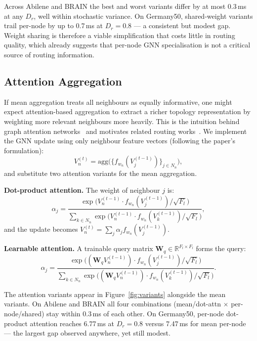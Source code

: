 \documentclass[10pt,twocolumn,letterpaper]{article}
\begin{document}
Across Abilene and BRAIN the best and worst variants differ by at most
0.3\,ms at any $D_r$, well within stochastic variance. On Germany50,
shared-weight variants trail per-node by up to 0.7\,ms at $D_r = 0.8$
--- a consistent but modest gap. Weight sharing is therefore a viable
simplification that costs little in routing quality, which already
suggests that per-node GNN specialisation is not a critical source of
routing information.

\subsection{Attention Aggregation}
\label{sec:attn}

If mean aggregation treats all neighbours as equally informative, one
might expect attention-based aggregation to extract a richer topology
representation by weighting more relevant neighbours more heavily. This
is the intuition behind graph attention networks~\cite{velickovic2018}
and motivates related routing works~\cite{strl,autognn}. We implement
the GNN update using only neighbour feature vectors (following the
paper's formulation):
\begin{equation}
  V_n^{(t)} = \mathrm{agg}\!\bigl(\{f_{w_n}(V_j^{(t-1)})\}_{j \in N_n}\bigr),
  \label{eq:gnn-nbr}
\end{equation}
and substitute two attention variants for the mean aggregation.

\textbf{Dot-product attention.} The weight of neighbour $j$ is:
\begin{equation}
  \alpha_j = \frac{
    \exp\!\bigl(V_n^{(t-1)} \cdot f_{w_n}(V_j^{(t-1)}) / \sqrt{F_l}\bigr)
  }{
    \sum_{k \in N_n}\!\exp\!\bigl(V_n^{(t-1)} \cdot f_{w_n}(V_k^{(t-1)}) / \sqrt{F_l}\bigr)
  },
  \label{eq:dot-attn}
\end{equation}
and the update becomes $V_n^{(t)} = \sum_{j} \alpha_j f_{w_n}(V_j^{(t-1)})$.

\textbf{Learnable attention.} A trainable query matrix
$\mathbf{W}_q \in \mathbb{R}^{F_l \times F_l}$ forms the query:
\begin{equation}
  \alpha_j = \frac{
    \exp\!\bigl((\mathbf{W}_q V_n^{(t-1)}) \cdot f_{w_n}(V_j^{(t-1)}) / \sqrt{F_l}\bigr)
  }{
    \sum_{k \in N_n}\!\exp\!\bigl((\mathbf{W}_q V_n^{(t-1)}) \cdot f_{w_n}(V_k^{(t-1)}) / \sqrt{F_l}\bigr)
  }.
  \label{eq:learn-attn}
\end{equation}

The attention variants appear in Figure~\ref{fig:variants} alongside
the mean variants. On Abilene and BRAIN all four combinations
(mean/dot-attn $\times$ per-node/shared) stay within 0.3\,ms of each
other. On Germany50, per-node dot-product attention reaches 6.77\,ms at
$D_r = 0.8$ versus 7.47\,ms for mean per-node --- the largest gap
observed anywhere, yet still modest.
\end{document}
